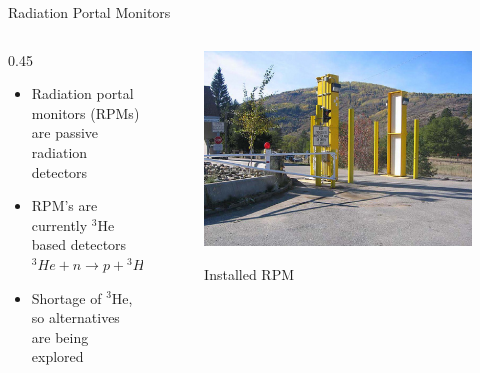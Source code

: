 \begin{frame}{Radiation Portal Monitors}

\begin{columns}[onlytextwidth]
	\begin{column} {0.45\textwidth}
  	\begin{itemize}
  		\item Radiation portal monitors (RPMs) are passive radiation detectors
  		\item {
  			 RPM's are currently   ${}^3$He based detectors
  			\center
    		${}^3He +n \to p +{}^3H$
    	}
  		\item 
  			Shortage of ${}^3$He, so alternatives are being explored
  		\end{itemize}
	\end{column}
	\begin{column}{0.5\textwidth}
		\centering
		\begin{figure}
			\includegraphics[width=\textwidth]{images/RPM8_Installed.eps}
			\label{fig:RPM8Installed}
			\caption{Installed RPM}
			\end{figure}
	\end{column}
\end{columns}
\end{frame}


